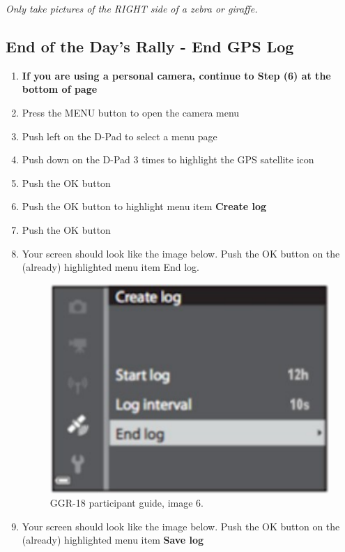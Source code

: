 \begin{center}
    \textit{
        \large{
            Only take pictures of the RIGHT side of a zebra or giraffe.
        }
    }
\end{center}

\subsection{End of the Day's Rally - End GPS Log}

\begin{enumerate}
    \item \textbf{If you are using a personal camera, continue to Step (6) at the bottom of page}
    \item Press the MENU button to open the camera menu
    \item Push left on the D-Pad to select a menu page
    \item Push down on the D-Pad 3 times to highlight the GPS satellite icon
    \item Push the OK button
    \item Push the OK button to highlight menu item \textbf{Create log}
    \item Push the OK button
    \item Your screen should look like the image below. Push the OK button on the (already) highlighted menu item End log.

          \begin{figure}[H]
              \begin{center}
                  \includegraphics[width=0.4\linewidth]{resources/guide7.pdf}
              \end{center}
              \caption{GGR-18 participant guide, image 6.}
          \end{figure}

    \item Your screen should look like the image below. Push the OK button on the (already) highlighted menu item \textbf{Save log}


\end{enumerate}
